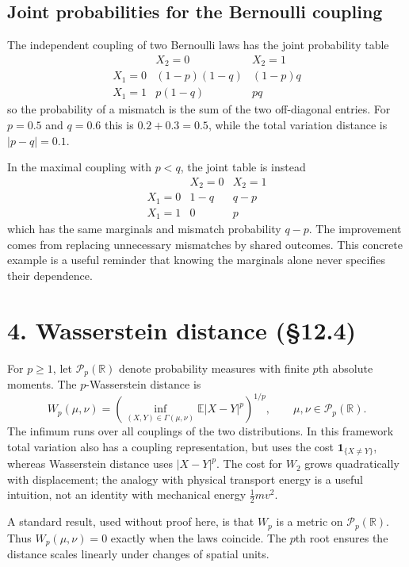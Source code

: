 \documentclass[10pt,a4paper]{article}
\newcommand{\R}{\mathbb R}\newcommand{\E}{\mathbb E}\newcommand{\N}{\mathbb N}
\begin{document}
\subsection*{Joint probabilities for the Bernoulli coupling}
The independent coupling of two Bernoulli laws has the joint probability table
\[
\begin{array}{c|cc}
 & X_2=0 & X_2=1 \\\hline
X_1=0 & (1-p)(1-q) & (1-p)q\\
X_1=1 & p(1-q) & pq
\end{array}
\]
so the probability of a mismatch is the sum of the two off-diagonal entries. For $p=0.5$ and $q=0.6$ this is $0.2+0.3=0.5$, while the total variation distance is $|p-q|=0.1$.

In the maximal coupling with $p<q$, the joint table is instead
\[
\begin{array}{c|cc}
 & X_2=0 & X_2=1 \\\hline
X_1=0 & 1-q & q-p\\
X_1=1 & 0 & p
\end{array}
\]
which has the same marginals and mismatch probability $q-p$. The improvement comes from replacing unnecessary mismatches by shared outcomes. This concrete example is a useful reminder that knowing the marginals alone never specifies their dependence.

\section*{4. Wasserstein distance (\S12.4)}
For $p\ge1$, let $\mathcal P_p(\R)$ denote probability measures with finite $p$th absolute moments. The $p$-Wasserstein distance is
\[
W_p(\mu,\nu)=\left(\inf_{(X,Y)\in\Gamma(\mu,\nu)}
\E|X-Y|^p\right)^{1/p},\qquad\mu,\nu\in\mathcal P_p(\R).
\]
The infimum runs over all couplings of the two distributions. In this framework total variation also has a coupling representation, but uses the cost $\mathbf1_{\{X\ne Y\}}$, whereas Wasserstein distance uses $|X-Y|^p$. The cost for $W_2$ grows quadratically with displacement; the analogy with physical transport energy is a useful intuition, not an identity with mechanical energy $\tfrac12 mv^2$.

A standard result, used without proof here, is that $W_p$ is a metric on $\mathcal P_p(\R)$. Thus $W_p(\mu,\nu)=0$ exactly when the laws coincide. The $p$th root ensures the distance scales linearly under changes of spatial units.
\end{document}
